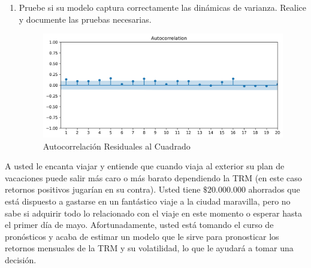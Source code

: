 \documentclass{article}
\theoremstyle{remark}
\theoremstyle{definition}
\begin{document}
\begin{enumerate}[label = \emph{\alph*})]
\begin{tcolorbox}[title=Soluci\'on 2.f]
            
        \end{tcolorbox}
    \item {Pruebe si su modelo captura correctamente las din\'amicas de varianza. Realice y documente las pruebas necesarias.}
        \begin{tcolorbox}[title=Soluci\'on 2.g]
            \begin{figure}[H]
                \centering
                \includegraphics[width=0.9\linewidth]{output/acf_residuales2.png}
                \caption{Autocorrelaci\'on Residuales al Cuadrado}
                \label{fig:acf_resid2}
            \end{figure}
        \end{tcolorbox}
\end{enumerate}

{A usted le encanta viajar y entiende que cuando viaja al exterior su plan de vacaciones puede salir m\'as caro o m\'as barato dependiendo la TRM (en este caso retornos positivos jugar\'ian en su contra). Usted tiene $\$20.000.000$ ahorrados que est\'a dispuesto a gastarse en un fant\'astico viaje a la ciudad maravilla, pero no sabe si adquirir todo lo relacionado con el viaje en este momento o esperar hasta el primer d\'ia de mayo. Afortunadamente, usted est\'a tomando el curso de pron\'osticos y acaba de estimar un modelo que le sirve para pronosticar los retornos mensuales de la TRM y su volatilidad, lo que le ayudar\'a a tomar una decisi\'on.}
\end{document}

